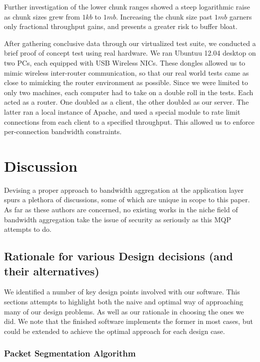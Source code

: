 \documentclass[12pt]{article}
\begin{document}
		Further investigation of the lower chunk ranges showed a steep logarithmic raise as chunk sizes grew from $1 kb$ to $1 mb$. Increasing the chunk size past $1 mb$ garners only fractional throughput gains, and presents a greater risk to buffer bloat. 

	After gathering conclusive data through our virtualized test suite, we conducted a brief proof of concept test using real hardware. We ran Ubuntuu 12.04 desktop on two PCs, each equipped with USB Wireless NICs. These dongles allowed us to mimic wireless inter-router communication, so that our real world tests came as close to mimicking the router environment as possible. Since we were limited to only two machines, each computer had to take on a double roll in the tests. Each acted as a router. One doubled as a client, the other doubled as our server. The latter ran a local instance of Apache, and used a special module to rate limit connections from each client to a specified throughput. This allowed us to enforce per-connection bandwidth constraints. 


\newpage
\section{Discussion}
	
	Devising a proper approach to bandwidth aggregation at the application layer spurs a plethora of discussions, some of which are unique in scope to this paper. As far as these authors are concerned, no existing works in the niche field of bandwidth aggregation take the issue of security as seriously as this MQP attempts to do. 
	\subsection{Rationale for various Design decisions (and their alternatives)}

		We identified a number of key design points involved with our software. This sections attempts to highlight both the naive and optimal way of approaching many of our design problems. As well as our rationale in choosing the ones we did. We note that the finished software implements the former in most cases, but could be extended to achieve the optimal approach for each design case. 

		\subsubsection{Packet Segmentation Algorithm}
\end{document}
